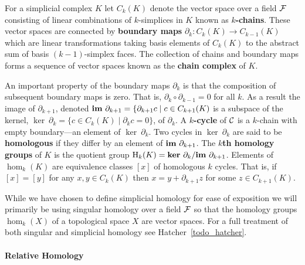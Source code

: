 
For a simplicial complex $K$ let $C_k(K)$ denote the vector space over a field $\mathcal{F}$ consisting of linear combinations of $k$-simplices in $K$ known as \textbf{$k$-chains}.
These vector spaces are connected by \textbf{boundary maps} $\partial_k:C_k(K)\to C_{k-1}(K)$ which are linear transformations taking basis elements of $C_k(K)$ to the abstract sum of basis $(k-1)$-simplex faces.
The collection of chains and boundary maps forms a sequence of vector spaces known as the \textbf{chain complex} of $K$.

An important property of the boundary maps $\partial_k$ is that the composition of subsequent boundary maps is zero.
That is, $\partial_k\circ\partial_{k-1} = 0$ for all $k$.
As a result the image of $\partial_{k+1}$, denoted $\mathbf{im}~\partial_{k+1} = \{\partial_{k+1}c\mid c\in C_{k+1}(K)$ is a subspace of the kernel, $\ker~\partial_k = \{c\in C_k(K)\mid \partial_k c = 0\}$, of $\partial_k$.
A \textbf{$k$-cycle} of $\mathcal{C}$ is a $k$-chain with empty boundary---an element of $\ker~\partial_k$.
Two cycles in $\ker~\partial_k$ are said to be \textbf{homologous} if they differ by an element of $\mathbf{im}~\partial_{k+1}$.
The \textbf{$k$th homology groups} of $K$ is the quotient group $\mathrm{H}_k(K) = \mathbf{ker}~\partial_k/\mathbf{im}~\partial_{k+1}$.
Elements of $\hom_k(K)$ are equivalence classes $[x]$ of homologous $k$ cycles.
That is, if $[x] = [y]$ for any $x,y\in C_k(K)$ then $x = y +\partial_{k+1}z$ for some $z\in C_{k+1}(K)$.



While we have chosen to define simplicial homology for ease of exposition we will primarily be using singular homology over a field $\mathcal{F}$ so that the homology groups $\hom_k(X)$ of a topological space $X$ are vector spaces.
For a full treatment of both singular and simplicial homology see Hatcher~\ref{todo_hatcher}.

\paragraph{Relative Homology}

